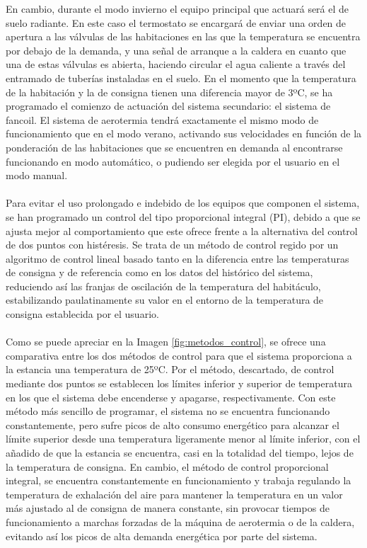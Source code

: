 \begin{itemize}
En cambio, durante el modo invierno el equipo principal que actuará será el de suelo radiante. En este caso el termostato se encargará de enviar una orden de apertura a las válvulas de las habitaciones en las que la temperatura se encuentra por debajo de la demanda, y una señal de arranque a la caldera en cuanto que una de estas válvulas es abierta, haciendo circular el agua caliente a través del entramado de tuberías instaladas en el suelo. En el momento que la temperatura de la habitación y la de consigna tienen una diferencia mayor de 3ºC, se ha programado el comienzo de actuación del sistema secundario: el sistema de fancoil. El sistema de aerotermia tendrá exactamente el mismo modo de funcionamiento que en el modo verano, activando sus velocidades en función de la ponderación de las habitaciones que se encuentren en demanda al encontrarse funcionando en modo automático, o pudiendo ser elegida por el usuario en el modo manual. \\\\
Para evitar el uso prolongado e indebido de los equipos que componen el sistema, se han programado un control del tipo proporcional integral (PI), debido a que se ajusta mejor al comportamiento que este ofrece frente a la alternativa del control de dos puntos con histéresis. Se trata de un método de control regido por un algoritmo de control lineal basado tanto en la diferencia entre las temperaturas de consigna y de referencia como en los datos del histórico del sistema, reduciendo así las franjas de oscilación de la temperatura del habitáculo, estabilizando paulatinamente su valor en el entorno de la temperatura de consigna establecida por el usuario. \\\\
Como se puede apreciar en la Imagen \ref{fig:metodos_control}, se ofrece una comparativa entre los dos métodos de control para que el sistema proporciona a la estancia una temperatura de 25ºC. Por el método, descartado, de control mediante dos puntos se establecen los límites inferior y superior de temperatura en los que el sistema debe encenderse y apagarse, respectivamente. Con este método más sencillo de programar, el sistema no se encuentra funcionando constantemente, pero sufre picos de alto consumo energético para alcanzar el límite superior desde una temperatura ligeramente menor al límite inferior, con el añadido de que la estancia se encuentra, casi en la totalidad del tiempo, lejos de la temperatura de consigna. En cambio, el método de control proporcional integral, se encuentra constantemente en funcionamiento y trabaja regulando la temperatura de exhalación del aire para mantener la temperatura en un valor más ajustado al de consigna de manera constante, sin provocar tiempos de funcionamiento a marchas forzadas de la máquina de aerotermia o de la caldera, evitando así los picos de alta demanda energética por parte del sistema. 

\end{itemize}
